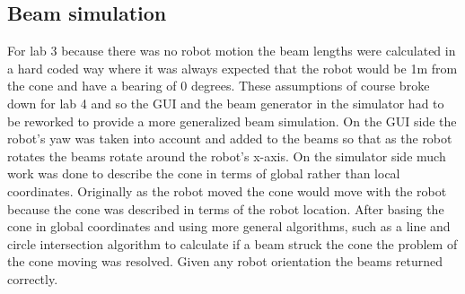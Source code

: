 \documentclass[letterpaper,12pt]{article}
\begin{document}
\subsection{Beam simulation}
For lab 3 because there was no robot motion the beam lengths were calculated in a hard coded way where it was always expected that the robot would be 1m from the cone and have a bearing of 0 degrees. These assumptions of course broke down for lab 4 and so the GUI and the beam generator in the simulator had to be reworked to provide a more generalized beam simulation. On the GUI side the robot's yaw was taken into account and added to the beams so that as the robot rotates the beams rotate around the robot's x-axis. On the simulator side much work was done to describe the cone in terms of global rather than local coordinates. Originally as the robot moved the cone would move with the robot because the cone was described in terms of the robot location. After basing the cone in global coordinates and using more general algorithms, such as a line and circle intersection algorithm to calculate if a beam struck the cone the problem of the cone moving was resolved. Given any robot orientation the beams returned correctly.
\end{document}
